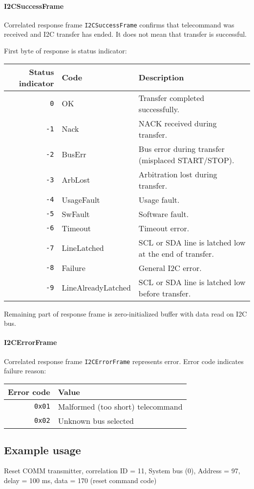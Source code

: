 \paragraph{I2CSuccessFrame}
Correlated response frame \texttt{I2CSuccessFrame} confirms that telecommand was received and I2C transfer has ended. It does not mean that transfer is successful.

First byte of response is status indicator:

\begin{tabular}{r | l | l}
	Status indicator & Code & Description \\
	\hline
	\texttt{0} & OK & Transfer completed successfully. \\
	\texttt{-1} & Nack & NACK received during transfer. \\
	\texttt{-2} & BusErr & Bus error during transfer (misplaced START/STOP). \\
	\texttt{-3} & ArbLost & Arbitration lost during transfer. \\
	\texttt{-4} & UsageFault & Usage fault. \\
	\texttt{-5} & SwFault & Software fault. \\
	\texttt{-6} & Timeout & Timeout error. \\
	\texttt{-7} & LineLatched & SCL or SDA line is latched low at the end of transfer. \\
	\texttt{-8} & Failure & General I2C error. \\
	\texttt{-9} & LineAlreadyLatched & SCL or SDA line is latched low before transfer. \\
\end{tabular}

Remaining part of response frame is zero-initialized buffer with data read on I2C bus. 

\paragraph{I2CErrorFrame}
Correlated response frame \texttt{I2CErrorFrame} represents error. Error code indicates failure reason:

\begin{tabular}{r | l}
	Error code & Value \\
	\hline
	\texttt{0x01} & Malformed (too short) telecommand \\
	\texttt{0x02} & Unknown bus selected \\
\end{tabular}

\subsection{Example usage}
Reset COMM transmitter, correlation ID = 11, System bus (0), Address = 97, delay = 100 ms, data = 170 (reset command code)
